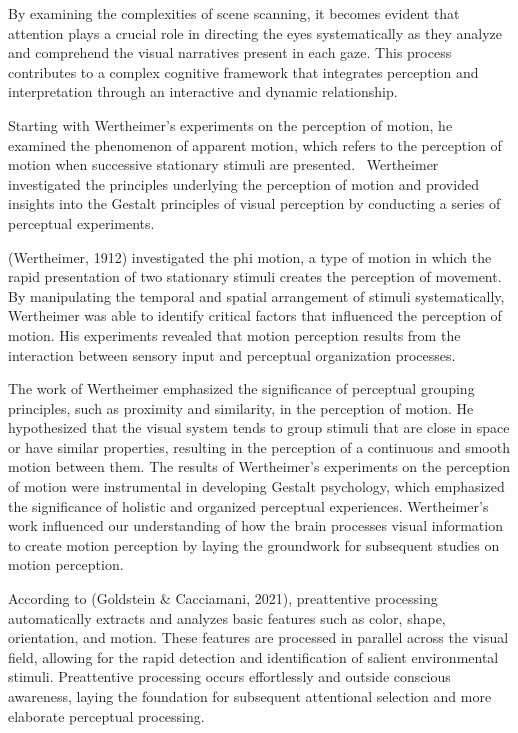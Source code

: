 \documentclass[print]{nuthesis}
\begin{document}
By examining the complexities of scene scanning, it becomes evident that attention plays a crucial role in directing the eyes systematically as they analyze and comprehend the visual narratives present in each gaze.
This process contributes to a complex cognitive framework that integrates perception and interpretation through an interactive and dynamic relationship.

Starting with Wertheimer's experiments on the perception of motion, he examined the phenomenon of apparent motion, which refers to the perception of motion when successive stationary stimuli are presented.~
Wertheimer investigated the principles underlying the perception of motion and provided insights into the Gestalt principles of visual perception by conducting a series of perceptual experiments.

(Wertheimer, 1912) investigated the phi motion, a type of motion in which the rapid presentation of two stationary stimuli creates the perception of movement.
By manipulating the temporal and spatial arrangement of stimuli systematically, Wertheimer was able to identify critical factors that influenced the perception of motion.
His experiments revealed that motion perception results from the interaction between sensory input and perceptual organization processes.

The work of Wertheimer emphasized the significance of perceptual grouping principles, such as proximity and similarity, in the perception of motion.
He hypothesized that the visual system tends to group stimuli that are close in space or have similar properties, resulting in the perception of a continuous and smooth motion between them.
The results of Wertheimer's experiments on the perception of motion were instrumental in developing Gestalt psychology, which emphasized the significance of holistic and organized perceptual experiences.
Wertheimer's work influenced our understanding of how the brain processes visual information to create motion perception by laying the groundwork for subsequent studies on motion perception.

According to (Goldstein \& Cacciamani, 2021), preattentive processing automatically extracts and analyzes basic features such as color, shape, orientation, and motion.
These features are processed in parallel across the visual field, allowing for the rapid detection and identification of salient environmental stimuli.
Preattentive processing occurs effortlessly and outside conscious awareness, laying the foundation for subsequent attentional selection and more elaborate perceptual processing.
\end{document}
